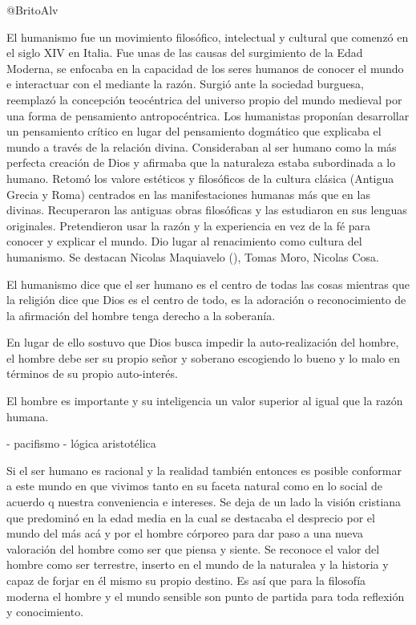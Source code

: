 \documentclass[14pt]{extarticle}
\begin{document}
@BritoAlv


El humanismo fue un movimiento filosófico, intelectual y cultural que comenzó
en el siglo XIV en Italia. Fue unas de las causas del surgimiento
de la Edad Moderna, se enfocaba en la capacidad de los seres humanos de
conocer el mundo e interactuar con el mediante la razón. Surgió ante la
sociedad burguesa, reemplazó la concepción teocéntrica del universo propio
del mundo medieval por una forma de pensamiento antropocéntrica. Los
humanistas proponían desarrollar un pensamiento crítico en lugar del
pensamiento dogmático que explicaba el mundo a través de la relación divina.
Consideraban al ser humano como la más perfecta creación de Dios y afirmaba
que la naturaleza estaba subordinada a lo humano. Retomó los valore estéticos
y filosóficos de la cultura clásica (Antigua Grecia y Roma) centrados en las 
manifestaciones humanas más que en las divinas. Recuperaron las antiguas obras
filosóficas y las estudiaron en sus lenguas originales. Pretendieron usar la 
razón y la experiencia en vez de la fé para conocer y explicar el mundo. 
Dio lugar al renacimiento como cultura del humanismo. Se destacan Nicolas
Maquiavelo (), Tomas Moro, Nicolas Cosa.

El humanismo dice que el ser humano es el centro de todas las cosas mientras
que la religión dice que Dios es el centro de todo, es la adoración o 
reconocimiento de la afirmación del hombre tenga derecho a la soberanía.

En lugar de ello sostuvo que Dios busca impedir la auto-realización del hombre,
el hombre debe ser su propio señor y soberano escogiendo lo bueno y lo malo en
términos de su propio auto-interés.

El hombre es importante y su inteligencia un valor superior al igual que la razón humana.

- pacifismo
- lógica aristotélica

Si el ser humano es racional y la realidad también entonces es posible conformar
a este mundo en que vivimos tanto en su faceta natural como en lo social de
acuerdo q nuestra conveniencia e intereses. Se deja de un lado la visión cristiana que predominó
en la edad media en la cual se destacaba el desprecio por el mundo del más acá y 
por el hombre córporeo para dar paso a una nueva valoración del hombre como ser que
piensa y siente. Se reconoce el valor del hombre como ser terrestre, inserto en el
mundo de la naturalea y la historia y capaz de forjar en él mismo su propio destino. 
Es así que para la filosofía moderna el hombre y el mundo sensible son punto de partida para toda reflexión y conocimiento.
\end{document}
